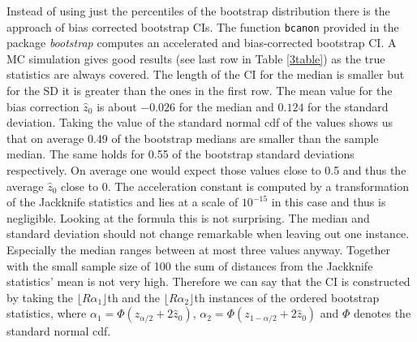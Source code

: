 Instead of using just the percentiles of the bootstrap distribution there is the approach of bias corrected bootstrap CIs. The function \texttt{bcanon} provided in the package \textit{bootstrap} computes an accelerated and bias-corrected bootstrap CI. A MC simulation gives good results (see last row in Table \ref{3table}) as the true statistics are always covered. The length of the CI for the median is smaller but for the SD it is greater than the ones in the first row. The mean value for the bias correction $\hat{z}_0$ is about $-0.026$ for the median and $0.124$ for the standard deviation. Taking the value of the standard normal cdf of the values shows us that on average 0.49 of the bootstrap medians are smaller than the sample median. The same holds for 0.55 of the bootstrap standard deviations respectively. On average one would expect those values close to 0.5 and thus the average $\hat{z}_0$ close to 0. The acceleration constant is computed by a transformation of the Jackknife statistics and lies at a scale of $10^{-15}$ in this case and thus is negligible. Looking at the formula this is not surprising. The median and standard deviation should not change remarkable when leaving out one instance. Especially the median ranges between at most three values anyway. Together with the small sample size of 100 the sum of distances from the Jackknife statistics' mean is not very high. Therefore we can say that the CI is constructed by taking the $\lfloor R\alpha_1 \rfloor$th and the $\lfloor R\alpha_2\rfloor$th instances of the ordered bootstrap statistics, where $\alpha_1=\Phi (z_{\alpha /2}+2\hat{z}_0)$, $\alpha_2=\Phi (z_{1-\alpha /2}+2\hat{z}_0)$ and $\Phi$ denotes the standard normal cdf. 


